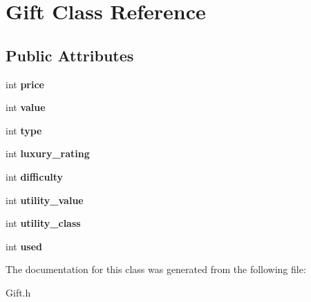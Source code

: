 \hypertarget{class_gift}{}\section{Gift Class Reference}
\label{class_gift}
\subsection*{Public Attributes}
\begin{DoxyCompactItemize}
\item 
\mbox{\label{class_gift_ad795362f286e8d5d73514fb64ac478b8}} 
int {\bfseries price}
\item 
\mbox{\label{class_gift_a71d14b92ebfd06993afe584f088bc748}} 
int {\bfseries value}
\item 
\mbox{\label{class_gift_a63fb63fdc6f0821417039da90a54ad4c}} 
int {\bfseries type}
\item 
\mbox{\label{class_gift_a8dad74474083de19fa0eed4b2b6e8e60}} 
int {\bfseries luxury\+\_\+rating}
\item 
\mbox{\label{class_gift_ae2d1aee64a09bae5e46914c8bf518690}} 
int {\bfseries difficulty}
\item 
\mbox{\label{class_gift_abb39e839cc029d8a50df87541e9c6763}} 
int {\bfseries utility\+\_\+value}
\item 
\mbox{\label{class_gift_a0ceaac7117c8f4abcaac4cd7e89547e9}} 
int {\bfseries utility\+\_\+class}
\item 
\mbox{\label{class_gift_a060bb74b499ea64b7448f6395c5151be}} 
int {\bfseries used}
\end{DoxyCompactItemize}


The documentation for this class was generated from the following file\+:\begin{DoxyCompactItemize}
\item 
Gift.\+h\end{DoxyCompactItemize}
